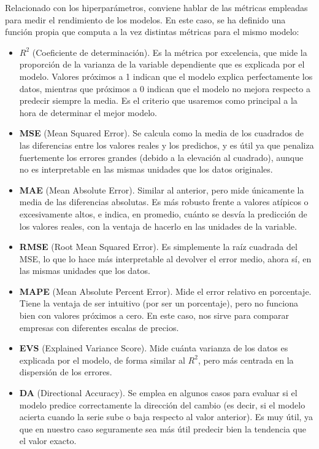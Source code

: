 \documentclass[a4paper,onecolumn]{extarticle}
\begin{document}
\begin{sloppypar}
Relacionado con los hiperparámetros, conviene hablar de las métricas empleadas para medir el rendimiento de los modelos. En este caso, se ha definido una función propia que computa 
a la vez distintas métricas para el mismo modelo:
\begin{itemize}
    \item \textbf{$R^2$} (Coeficiente de determinación). Es la métrica por excelencia, que mide la proporción de la varianza de la variable dependiente que es explicada por el modelo. 
    Valores próximos a 1 indican que el modelo explica perfectamente los datos, mientras que próximos a 0 indican que el modelo no mejora respecto a predecir siempre la media. Es el
    criterio que usaremos como principal a la hora de determinar el mejor modelo.
    \item \textbf{MSE} (Mean Squared Error). Se calcula como la media de los cuadrados de las diferencias entre los valores reales y los predichos, y es útil ya que penaliza 
    fuertemente los errores grandes (debido a la elevación al cuadrado), aunque no es interpretable en las mismas unidades que los datos originales.
    \item \textbf{MAE} (Mean Absolute Error). Similar al anterior, pero mide únicamente la media de las diferencias absolutas. Es más robusto frente a valores atípicos o excesivamente 
    altos, e indica, en promedio, cuánto se desvía la predicción de los valores reales, con la ventaja de hacerlo en las unidades de la variable.
    \item \textbf{RMSE} (Root Mean Squared Error). Es simplemente la raíz cuadrada del MSE, lo que lo hace más interpretable al devolver el error medio, ahora sí, en las mismas unidades 
    que los datos.
    \item \textbf{MAPE} (Mean Absolute Percent Error). Mide el error relativo en porcentaje. Tiene la ventaja de ser intuitivo (por ser un porcentaje), pero no funciona bien con
    valores próximos a cero. En este caso, nos sirve para comparar empresas con diferentes escalas de precios.
    \item \textbf{EVS} (Explained Variance Score). Mide cuánta varianza de los datos es explicada por el modelo, de forma similar al $R^2$, pero más centrada en la dispersión de los 
    errores.
    \item \textbf{DA} (Directional Accuracy). Se emplea en algunos casos para evaluar si el modelo predice correctamente la dirección del cambio (es decir, si el modelo acierta cuando 
    la serie sube o baja respecto al valor anterior). Es muy útil, ya que en nuestro caso seguramente sea más útil predecir bien la tendencia que el valor exacto.
\end{itemize}


\end{sloppypar}
\end{document}
